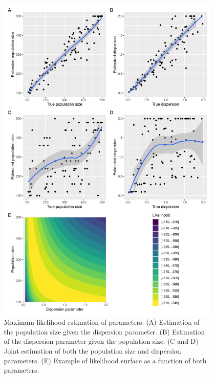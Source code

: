 \documentclass{article}
\begin{document}
\begin{figure}[!p]
\begin{center}
\includegraphics[width=13cm]{../run/figureEstim.pdf}
\end{center}
\caption{Maximum likelihood estimation of parameters. (A) Estimation of the population
size given the dispersion parameter. (B) Estimation of the dispersion parameter
given the population size. (C and D) Joint estimation of both the population
size and dispersion parameters. (E) Example of likelihood surface as a function
of both parameters.
\label{fig:estim}}
\end{figure}
\end{document}
